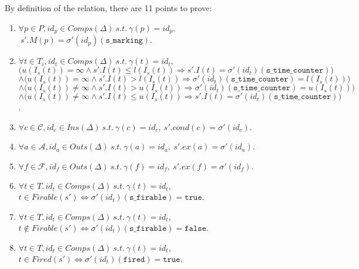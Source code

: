 \documentclass[dvipsnames,12pt]{article}
\begin{document}
\begin{niproof}
  By definition of the  relation, there
  are 11 points to prove:
  \begin{frameb}
    \begin{enumerate}
    \item
      $\forall{}p\in{}P,id_p\in{}Comps(\Delta)~s.t.~\gamma(p)=id_p,$
      $~s'.M(p)=\sigma'(id_p)(\texttt{s\_marking})$.\label{item:fe-equal-marking}
    \item
      $\forall{}t\in{}T_i,id_t\in{}Comps(\Delta)~s.t.~\gamma(t)=id_t,$\\
      $\big(u(I_s(t))=\infty\land{}s'.I(t)\le{}l(I_s(t))\Rightarrow{}s'.I(t)=\sigma'(id_t)(\texttt{s\_time\_counter})\big)$\\
      $\land\big(u(I_s(t))=\infty\land{}s'.I(t)>{}l(I_s(t))\Rightarrow{}\sigma'(id_t)(\texttt{s\_time\_counter})=l(I_s(t))\big)$\\
      $\land\big(u(I_s(t))\neq\infty\land{}s'.I(t)>{}u(I_s(t))\Rightarrow{}\sigma'(id_t)(\texttt{s\_time\_counter})=u(I_s(t))\big)$\\
      $\land\big(u(I_s(t))\neq\infty\land{}s'.I(t)\le{}u(I_s(t))\Rightarrow{}s'.I(t)=\sigma'(id_t)(\texttt{s\_time\_counter})\big)$.
      \label{item:fe-equal-tc}
    \item
      $\forall{}c\in\mathcal{C},id_c\in{}Ins(\Delta)~s.t.~\gamma(c)=id_c,~s'.cond(c)=\sigma'(id_c)$.\label{item:fe-equal-cond-values}
    \item
      $\forall{}a\in\mathcal{A},id_a\in{}Outs(\Delta)~s.t.~\gamma(a)=id_a,~s'.ex(a)=\sigma'(id_a)$.\label{item:fe-equal-act-exec}
    \item
      $\forall{}f\in\mathcal{F},id_f\in{}Outs(\Delta)~s.t.~\gamma(f)=id_f,~s'.ex(f)=\sigma'(id_f)$.\label{item:fe-equal-fun-exec}
    \item
      $\forall{}t\in{}T,id_t\in{}Comps(\Delta)~s.t.~\gamma(t)=id_t,$\\
      $t\in{}Firable(s')\Leftrightarrow\sigma'(id_t)(\texttt{s\_firable})=\mathtt{true}$.\label{item:fe-equal-firable}
    \item
      $\forall{}t\in{}T,id_t\in{}Comps(\Delta)~s.t.~\gamma(t)=id_t,$\\
      $t\notin{}Firable(s')\Leftrightarrow\sigma'(id_t)(\texttt{s\_firable})=\mathtt{false}$.\label{item:fe-equal-not-firable}
    \item
      $\forall{}t\in{}T,id_t\in{}Comps(\Delta)~s.t.~\gamma(t)=id_t,$
      $t\in{}Fired(s')\Leftrightarrow\sigma'(id_t)(\texttt{fired})=\mathtt{true}$.\label{item:fe-equal-fired}

\end{enumerate}
\end{frameb}
\end{niproof}
\end{document}
